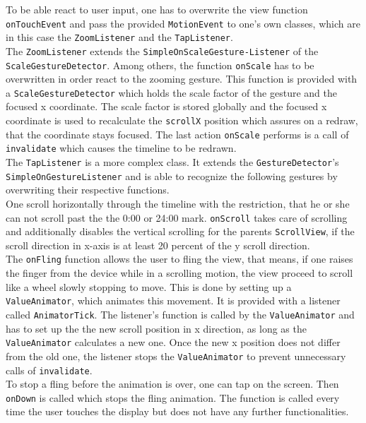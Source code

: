 To  be able react to user input, one has to overwrite the view function \lstinline$onTouchEvent$ and pass the provided \lstinline$MotionEvent$ to one's own classes, which are in this case the \lstinline$ZoomListener$ and the \lstinline$TapListener$.\\
The  \lstinline$ZoomListener$ extends the \lstinline$SimpleOnScaleGesture-Listener$ of the \lstinline$ScaleGestureDetector$. Among others, the function \lstinline$onScale$ has to be overwritten in order react to the zooming gesture. This function is provided with a \lstinline$ScaleGestureDetector$ which holds the scale factor of the gesture and the focused x coordinate. The scale factor is stored globally and the focused x coordinate is used to recalculate the \lstinline$scrollX$ position which assures on a redraw, that the coordinate stays focused. The last action \lstinline$onScale$ performs is a call of \lstinline$invalidate$ which causes the timeline to be redrawn.\\
The  \lstinline$TapListener$ is a more complex class. It extends the \lstinline$GestureDetector$'s  \lstinline$SimpleOnGestureListener$ and is able to recognize the following gestures by overwriting their respective functions.\\
One  scroll horizontally through the timeline with the restriction, that he or she can not scroll past the the 0:00 or 24:00 mark. \lstinline$onScroll$ takes care of scrolling and additionally disables the vertical scrolling for the parents \lstinline$ScrollView$, if the scroll direction in x-axis is at least 20 percent of the y scroll direction.\\
The \lstinline$onFling$ function allows the user to fling the view, that means, if one raises the finger from the device while in a scrolling motion, the view proceed to scroll like a wheel slowly stopping to move. This is done by setting up a \lstinline$ValueAnimator$, which animates this movement. It is provided with a listener called \lstinline$AnimatorTick$. The listener's function is called by the \lstinline$ValueAnimator$ and has to set up the the new scroll position in x direction, as long as the \lstinline$ValueAnimator$ calculates a new one. Once the new x position does not differ from the old one, the listener stops the \lstinline$ValueAnimator$ to prevent unnecessary calls of \lstinline$invalidate$.\\
To stop a fling before the animation is over, one can tap on the screen. Then \lstinline$onDown$ is called which stops the fling animation. The function is called every time the user touches the display but does not have any further functionalities.\\
